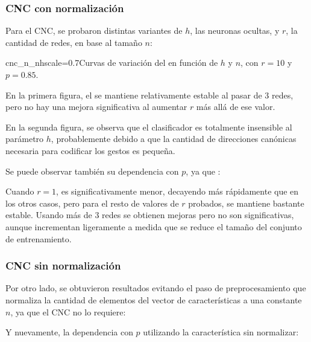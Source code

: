 \subsubsection{CNC con normalización}
Para el CNC, se probaron distintas variantes de $h$, las neuronas ocultas, y $r$, la cantidad de redes, en base al tamaño $n$:

{cnc_n_nh}{scale=0.7}{Curvas de variación del \cc en función de $h$ y $n$, con $r=10$ y $p=0.85$.}

En la primera figura, el \cc se mantiene relativamente estable al pasar de $3$ redes, pero no hay una mejora significativa al aumentar $r$ más allá de ese valor.

En la segunda figura, se observa que el clasificador es totalmente insensible al parámetro $h$, probablemente debido a que la cantidad de direcciones canónicas necesaria para codificar los gestos es pequeña. 

Se puede observar también su dependencia con $p$, ya que :


Cuando $r=1$, \cc es significativamente menor, decayendo más rápidamente que en los otros casos, pero para el resto de valores de $r$ probados, \cc se mantiene bastante estable. Usando más de $3$ redes se obtienen mejoras pero no son significativas, aunque incrementan ligeramente a medida que se reduce el tamaño del conjunto de entrenamiento.

\subsubsection{CNC sin normalización}

Por otro lado, se obtuvieron resultados evitando el paso de preprocesamiento que normaliza la cantidad de elementos del vector de características a una constante $n$, ya que el CNC no lo requiere:



Y nuevamente, la dependencia con $p$ utilizando la característica sin normalizar:


